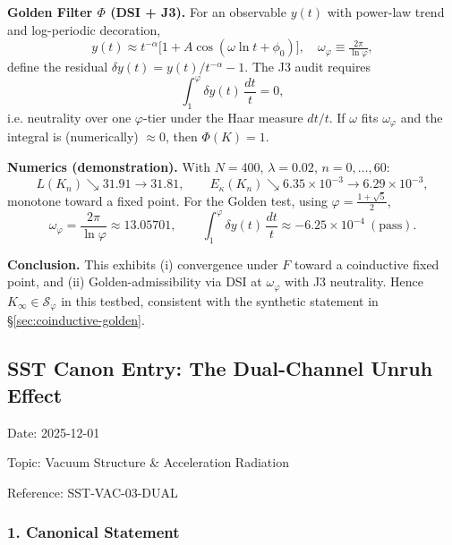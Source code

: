 \documentclass[10pt,reprint,aps,onecolumn,nofootinbib]{revtex4-2}
\begin{document}
        \medskip
        \noindent
        \textbf{Golden Filter \(\Phi\) (DSI + J3).} For an observable \(y(t)\) with power-law trend
        and log-periodic decoration,
        \[
            y(t)\approx t^{-\alpha}\bigl[1+A\cos(\omega\ln t+\phi_0)\bigr],
            \quad
            \omega_\varphi \equiv \tfrac{2\pi}{\ln\varphi},
        \]
        define the residual \(\delta y(t) = y(t)/t^{-\alpha}-1\).
        The J3 audit requires
        \[
            \int_{1}^{\varphi}\delta y(t)\,\frac{dt}{t}=0,
        \]
        i.e. neutrality over one \(\varphi\)-tier under the Haar measure \(dt/t\).
        If \(\omega\) fits \(\omega_\varphi\) and the integral is (numerically) \(\approx 0\), then \(\Phi(K)=1\).

        \medskip
        \noindent
        \textbf{Numerics (demonstration).}
        With \(N=400\), \(\lambda=0.02\), \(n=0,\dots,60\):
        \[
            L(K_n)\searrow 31.91\rightarrow 31.81,\qquad
            E_\kappa(K_n)\searrow 6.35\!\times\!10^{-3}\rightarrow 6.29\!\times\!10^{-3},
        \]
        monotone toward a fixed point.
        For the Golden test, using \(\varphi=\tfrac{1+\sqrt{5}}{2}\),
        \[
            \omega_\varphi=\frac{2\pi}{\ln\varphi}\approx 13.05701,
            \qquad
            \int_{1}^{\varphi}\delta y(t)\,\frac{dt}{t}\approx -6.25\times10^{-4}\ (\text{pass}).
        \]

        \medskip
        \noindent
        \textbf{Conclusion.}
        This exhibits (i) convergence under \(F\) toward a coinductive fixed point, and
        (ii) Golden-admissibility via DSI at \(\omega_\varphi\) with J3 neutrality.
        Hence \(K_\infty\in\mathcal S_\varphi\) in this testbed, consistent with the
        synthetic statement in \S\ref{sec:coinductive-golden}.



    \subsection*{\textbf{SST Canon Entry: The Dual-Channel Unruh Effect}}


        Date: 2025-12-01

        Topic: Vacuum Structure & Acceleration Radiation

        Reference: SST-VAC-03-DUAL



        \subsubsection*{\textbf{1. Canonical Statement}}
\end{document}
